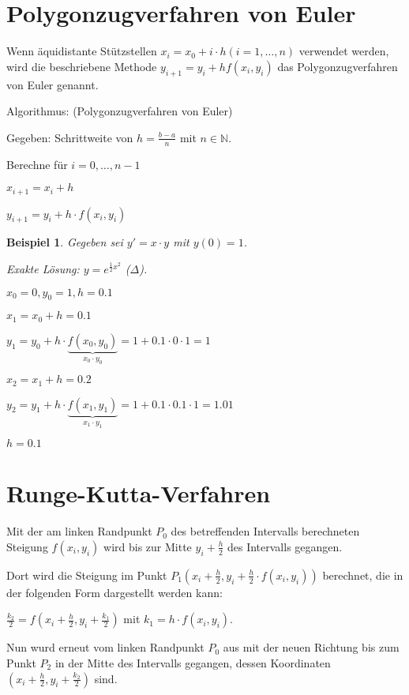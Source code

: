 \documentclass[fontset=ubuntu,11pt,a4paper,fleqn,headsepline]{scrreprt}
\newtheorem{beispiel}[defi]{Beispiel}
\begin{document}
\begin{multicols}{2}
    \section*{Polygonzugverfahren von Euler}
    
    Wenn äquidistante Stützstellen \(x_i=x_0+i\cdot h (i=1,\dots,n)\) verwendet werden, wird die beschriebene Methode \(y_{i+1}=y_i+hf(x_i,y_i)\) das Polygonzugverfahren von Euler genannt.
    
    Algorithmus: (Polygonzugverfahren von Euler)
    
    Gegeben: Schrittweite von \(h=\frac{b-a}{n}\) mit \(n\in\mathbb{N}\).
    
    Berechne für \(i=0,\dots,n-1\)
    
    \(x_{i+1}=x_i+h\)
    
    \(y_{i+1}=y_i+h\cdot f(x_i,y_i)\)
    
    \begin{beispiel}
        Gegeben sei \(y'=x\cdot y\) mit \(y(0)=1\).
        
        Exakte Lösung: \(y=e^{\frac{1}{2}x^2}\) (\(\Delta\)).
    
        \(x_0=0,y_0=1,h=0.1\)
    
        \(x_1=x_0+h=0.1\)
        
        \(y_1=y_0+h\cdot \underbrace{f(x_0,y_0)}_{x_0\cdot y_0}=1+0.1\cdot 0\cdot 1 = 1\)
    
        \(x_2=x_1+h=0.2\)
        
        \(y_2=y_1+h\cdot \underbrace{f(x_1,y_1)}_{x_1\cdot y_1}=1+0.1\cdot 0.1\cdot 1 = 1.01\)
        
        \(h=0.1\)
    \end{beispiel}
    
    \section*{Runge-Kutta-Verfahren}
    Mit der am linken Randpunkt \(P_0\) des betreffenden Intervalls berechneten Steigung \(f(x_i,y_i)\) wird bis zur Mitte \(y_i+\frac{h}{2}\) des Intervalls gegangen.

    Dort wird die Steigung im Punkt \(P_1(x_i+\frac{h}{2}, y_i+\frac{h}{2}\cdot f(x_i,y_i))\) berechnet, die in der folgenden Form dargestellt werden kann:

    \(\frac{k_2}{2}=f(x_i+\frac{h}{2}, y_i+\frac{k_1}{2})\) mit \(k_1=h\cdot f(x_i,y_i)\).

    Nun wurd erneut vom linken Randpunkt \(P_0\) aus mit der neuen Richtung bis zum Punkt \(P_2\) in der Mitte des Intervalls gegangen, dessen Koordinaten \((x_i+\frac{h}{2},y_i+\frac{k_2}{2})\) sind. 
    

\end{multicols}
\end{document}
